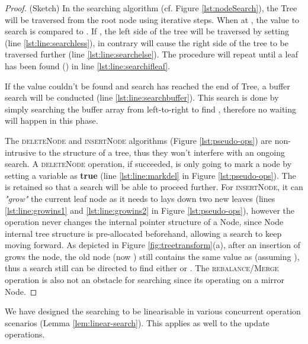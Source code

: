 \begin{proof}(Sketch) In the searching algorithm (cf. Figure
\ref{lst:nodeSearch}), the Tree will be traversed from the root node
using iterative steps. When at , the value to search  is compared to
. If , the left side of the tree will be traversed
by setting  (line \ref{lst:line:searchless}), in contrary
 will cause the right side of the tree to be traversed
further (line \ref{lst:line:searchelse}). The procedure will repeat until a leaf
has been found () in line \ref{lst:line:searchifleaf}.

If the value  couldn't be found and search has reached the end of 
Tree, a buffer search will be conducted
(line \ref{lst:line:searchbuffer}).
This search is done by simply searching the buffer array from left-to-right
to find , therefore no waiting will happen in this phase.

The \textsc{deleteNode} and \textsc{insertNode} algorithms (Figure
\ref{lst:pseudo-ops}) are non-intrusive to the structure of a tree, thus they
won't interfere with an ongoing search. A \textsc{deleteNode} operation, if
succeeded, is only going to mark a node by setting a  variable as
\textbf{true} (line \ref{lst:line:markdel} in Figure \ref{lst:pseudo-ops}).
The  is retained so that a search will be able to proceed further.
For \textsc{insertNode}, it can \textit{"grow"} the current leaf node as it
needs to lays down two new leaves (lines  \ref{lst:line:growins1} and
\ref{lst:line:growins2} in Figure \ref{lst:pseudo-ops}), however the operation
never changes the internal pointer structure of a Node, since
Node internal tree structure is pre-allocated beforehand, allowing a
search to keep moving forward.
As depicted in Figure \ref{fig:treetransform}(a), after an insertion of 
grows the node, the old node (now ) still contains the same value as 
(assuming ), thus a search still can be directed to find either  or
.
 The \textsc{rebalance/Merge} operation is also not an obstacle for searching
 since its operating on a mirror Node.
\end{proof}

We have designed the searching to be linearisable in various concurrent
operation scenarios (Lemma \ref{lem:linear-search}). This applies as well to the
update operations.

